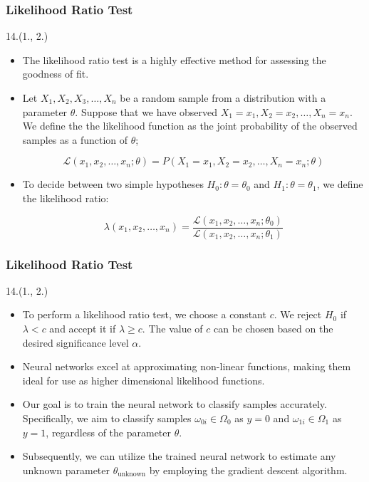 \documentclass[12pt, xcolor={dvipsnames}, aspectratio = 169, sans,mathserif]{beamer}
\newenvironment{List}[2]
{\begin{textblock}{#1}#2
\begin{itemize}}
{\end{itemize}
\end{textblock}}
\newcommand{\BeamerCite}[1]{{\tiny \footfullcite{#1}}}
\begin{document}
\begin{frame}
\frametitle{Likelihood Ratio Test}

\begin{List}{14.}{(1., 2.)}

    \item The likelihood ratio test is a highly effective method for assessing the goodness of fit.

    \item Let $X_1, X_2, X_3, \ldots, X_n$ be a random sample from a distribution with a parameter $\theta$. Suppose that we have observed $X_1 = x_1, X_2 = x_2, \ldots, X_n = x_n$. We define the the likelihood function as the joint probability of the observed samples as a function of $\theta$;

    \begin{equation*}
    \mathcal{L}(x_1, x_2, \ldots, x_n; \theta) = P(X_1=x_1, X_2=x_2, \ldots, X_n=x_n; \theta)
    \end{equation*}

    \item To decide between two simple hypotheses $H_0: \theta = \theta_0$ and $H_1: \theta = \theta_1$, we define the likelihood ratio:

    \begin{equation*}
    \lambda(x_1, x_2, \ldots, x_n) = \frac{\mathcal{L}(x_1, x_2, \ldots, x_n; \theta_0)}{\mathcal{L}(x_1, x_2, \ldots, x_n;\theta_1)}
    \end{equation*}

\end{List}

\end{frame}


\begin{frame}
\frametitle{Likelihood Ratio Test}

\begin{List}{14.}{(1., 2.)}
    \item To perform a likelihood ratio test, we choose a constant $c$. We reject $H_0$ if $\lambda < c$ and accept it if $\lambda \geq c$. The value of $c$ can be chosen based on the desired significance level $\alpha$.

    \item Neural networks excel at approximating non-linear functions, making them ideal for use as higher dimensional likelihood functions.

    \item Our goal is to train the neural network to classify samples accurately. Specifically, we aim to classify samples $\omega_{0i} \in \Omega_0$ as $y = 0$ and $\omega_{1i} \in \Omega_1$ as $y = 1$, regardless of the parameter $\theta$.

    \item Subsequently, we can utilize the trained neural network to estimate any unknown parameter $\theta_{\text{unknown}}$ by employing the gradient descent algorithm.\BeamerCite{Andreassen:2019nnm}

\end{List}

\end{frame}
\end{document}
